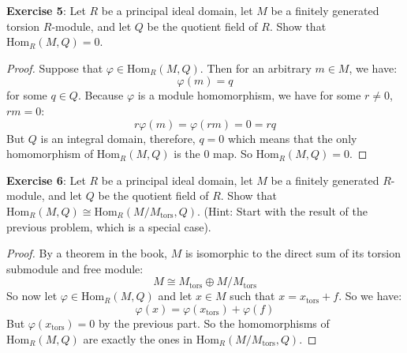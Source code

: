 \documentclass{article}
\begin{document}
\textbf{Exercise 5}: Let $R$ be a principal ideal domain, let $M$ be a finitely generated torsion $R$-module, and let $Q$ be the quotient field of $R$. Show that $\text{Hom}_{R}(M, Q) = 0$.
    \begin{proof}
        Suppose that $\varphi \in \text{Hom}_{R}(M, Q)$. Then for an arbitrary $m \in M$, we have:
            \begin{equation*}
                \varphi(m) = q
            \end{equation*}
        for some $q \in Q$. Because $\varphi$ is a module homomorphism, we have for some $r \neq 0$, $rm = 0$:
            \begin{equation*}
                r\varphi(m) = \varphi(rm) = 0 = rq
            \end{equation*}
        But $Q$ is an integral domain, therefore, $q = 0$ which means that the only homomorphism of $\text{Hom}_{R}(M, Q)$ is the $0$ map. So $\text{Hom}_{R}(M, Q) = 0$.
    \end{proof}

\textbf{Exercise 6}: Let $R$ be a principal ideal domain, let $M$ be a finitely generated $R$-module, and let $Q$ be the quotient field of $R$. Show that $\text{Hom}_{R}(M, Q) \cong \text{Hom}_{R}(M/M_{\text{tors}}, Q)$. (Hint: Start with the result of the previous problem, which is a special case).
    \begin{proof}
        By a theorem in the book, $M$ is isomorphic to the direct sum of its torsion submodule and free module:
            \begin{equation*}
                M \cong M_{\text{tors}} \oplus M/M_{\text{tors}}
            \end{equation*}
        So now let $\varphi \in \text{Hom}_{R}(M, Q)$ and let $x \in M$ such that $x = x_{\text{tors}} + f$. So we have:
            \begin{equation*}
                \varphi(x) = \varphi(x_{\text{tors}}) + \varphi(f)
            \end{equation*}
        But $\varphi(x_{\text{tors}}) = 0$ by the previous part. So the homomorphisms of $\text{Hom}_{R}(M, Q)$ are exactly the ones in $\text{Hom}_{R}(M/M_{\text{tors}}, Q)$.
    \end{proof}
\end{document}
